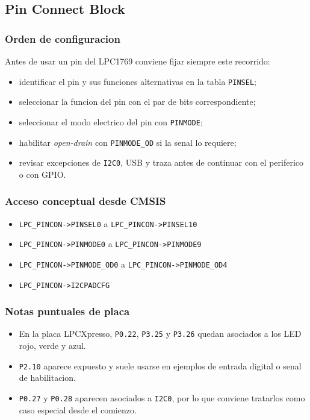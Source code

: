 \subsection{Pin Connect Block}

\subsubsection{Orden de configuracion}
Antes de usar un pin del LPC1769 conviene fijar siempre este recorrido:

\begin{itemize}
  \item identificar el pin y sus funciones alternativas en la tabla \texttt{PINSEL};
  \item seleccionar la funcion del pin con el par de bits correspondiente;
  \item seleccionar el modo electrico del pin con \texttt{PINMODE};
  \item habilitar \textit{open-drain} con \texttt{PINMODE\_OD} si la senal lo requiere;
  \item revisar excepciones de \texttt{I2C0}, USB y traza antes de continuar con el periferico o con GPIO.
\end{itemize}

\subsubsection{Acceso conceptual desde CMSIS}
\begin{itemize}
  \item \texttt{LPC\_PINCON->PINSEL0} a \texttt{LPC\_PINCON->PINSEL10}
  \item \texttt{LPC\_PINCON->PINMODE0} a \texttt{LPC\_PINCON->PINMODE9}
  \item \texttt{LPC\_PINCON->PINMODE\_OD0} a \texttt{LPC\_PINCON->PINMODE\_OD4}
  \item \texttt{LPC\_PINCON->I2CPADCFG}
\end{itemize}

\subsubsection{Notas puntuales de placa}
\begin{itemize}
  \item En la placa LPCXpresso, \texttt{P0.22}, \texttt{P3.25} y \texttt{P3.26} quedan asociados a los LED rojo, verde y azul.
  \item \texttt{P2.10} aparece expuesto y suele usarse en ejemplos de entrada digital o senal de habilitacion.
  \item \texttt{P0.27} y \texttt{P0.28} aparecen asociados a \texttt{I2C0}, por lo que conviene tratarlos como caso especial desde el comienzo.
\end{itemize}

